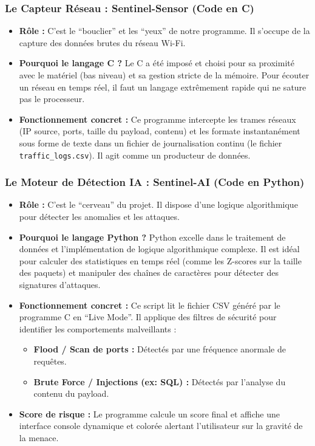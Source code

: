 \documentclass[a4paper, 12pt, twoside]{article}
\begin{document}
\subsubsection{Le Capteur Réseau : Sentinel-Sensor (Code en C)}
\begin{itemize}
    \item \textbf{Rôle :} C'est le ``bouclier'' et les ``yeux'' de notre programme. Il s'occupe de la capture des données brutes du réseau Wi-Fi.
    \item \textbf{Pourquoi le langage C ?} Le C a été imposé et choisi pour sa proximité avec le matériel (bas niveau) et sa gestion stricte de la mémoire. Pour écouter un réseau en temps réel, il faut un langage extrêmement rapide qui ne sature pas le processeur.
    \item \textbf{Fonctionnement concret :} Ce programme intercepte les trames réseaux (IP source, ports, taille du payload, contenu) et les formate instantanément sous forme de texte dans un fichier de journalisation continu (le fichier \texttt{traffic\_logs.csv}). Il agit comme un producteur de données.
\end{itemize}

\subsubsection{Le Moteur de Détection IA : Sentinel-AI (Code en Python)}
\begin{itemize}
    \item \textbf{Rôle :} C'est le ``cerveau'' du projet. Il dispose d'une logique algorithmique pour détecter les anomalies et les attaques.
    \item \textbf{Pourquoi le langage Python ?} Python excelle dans le traitement de données et l'implémentation de logique algorithmique complexe. Il est idéal pour calculer des statistiques en temps réel (comme les Z-scores sur la taille des paquets) et manipuler des chaînes de caractères pour détecter des signatures d'attaques.
    \item \textbf{Fonctionnement concret :} Ce script lit le fichier CSV généré par le programme C en ``Live Mode''. Il applique des filtres de sécurité pour identifier les comportements malveillants :
    \begin{itemize}
        \item \textbf{Flood / Scan de ports :} Détectés par une fréquence anormale de requêtes.
        \item \textbf{Brute Force / Injections (ex: SQL) :} Détectés par l'analyse du contenu du payload.
    \end{itemize}
    \item \textbf{Score de risque :} Le programme calcule un score final et affiche une interface console dynamique et colorée alertant l'utilisateur sur la gravité de la menace.
\end{itemize}
\end{document}

